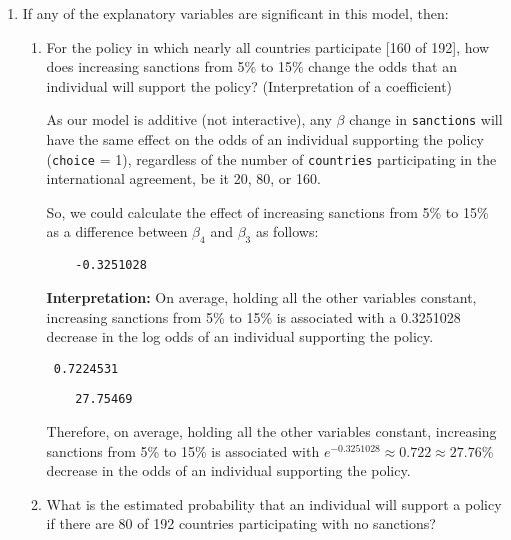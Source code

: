 \documentclass[12pt,letterpaper]{article}
\begin{document}
\begin{enumerate}
	\item
	If any of the explanatory variables are significant in this model, then:
	\begin{enumerate}
		\item
		For the policy in which nearly all countries participate [160 of 192], how does increasing sanctions from 5\% to 15\% change the odds that an individual will support the policy? (Interpretation of a coefficient)
		\vspace{.25cm}


As our model is additive (not interactive), any $\beta$ change in  \texttt{sanctions} will have the same effect on the odds of an individual supporting the policy (\texttt{choice} = 1), regardless of the number of \texttt{countries}  participating in the international agreement, be it 20, 80, or 160.

So, we could calculate the effect of increasing sanctions from  5\% to 15\% as a difference between $\beta_4$ and $\beta_3$ as follows:

 

\begin{verbatim}
	-0.3251028
\end{verbatim}

\textbf{Interpretation:} On average, holding all the other variables constant, increasing sanctions from 5\% to 15\% is associated with a 0.3251028 decrease in the log odds of an individual supporting the policy.

 

\begin{verbatim}
 0.7224531
\end{verbatim}

 

\begin{verbatim}
	27.75469 
\end{verbatim}

Therefore, on average, holding all the other variables constant, increasing sanctions from 5\% to 15\% is associated with \( e^{-0.3251028} \approx 0.722 \approx 27.76\% \) decrease in the odds of an individual supporting the policy.

		\item
		What is the estimated probability that an individual will support a policy if there are 80 of 192 countries participating with no sanctions? \\
	\vspace{.25cm}
	

\end{enumerate}
\end{enumerate}
\end{document}
